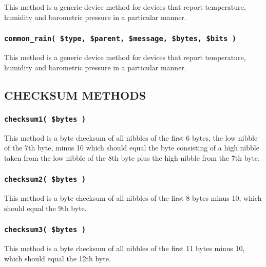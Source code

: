 \documentclass[12pt,a4paper]{article}
\begin{document}
This method is a generic device method for devices that report
temperature, humidity and barometric pressure in a particular manner.

\subsubsection*{\texttt{common\_rain( \$type, \$parent, \$message, \$bytes, \$bits )}\label{xPL::RF::Oregon_common_rain_type_parent_message_bytes_bits_}}


This method is a generic device method for devices that report
temperature, humidity and barometric pressure in a particular manner.

\subsection*{CHECKSUM METHODS\label{xPL::RF::Oregon_CHECKSUM_METHODS}}
\subsubsection*{\texttt{checksum1( \$bytes )}\label{xPL::RF::Oregon_checksum1_bytes_}}


This method is a byte checksum of all nibbles of the first 6 bytes,
the low nibble of the 7th byte, minus 10 which should equal the byte
consisting of a high nibble taken from the low nibble of the 8th byte
plus the high nibble from the 7th byte.

\subsubsection*{\texttt{checksum2( \$bytes )}\label{xPL::RF::Oregon_checksum2_bytes_}}


This method is a byte checksum of all nibbles of the first 8 bytes
minus 10, which should equal the 9th byte.

\subsubsection*{\texttt{checksum3( \$bytes )}\label{xPL::RF::Oregon_checksum3_bytes_}}


This method is a byte checksum of all nibbles of the first 11 bytes
minus 10, which should equal the 12th byte.
\end{document}
